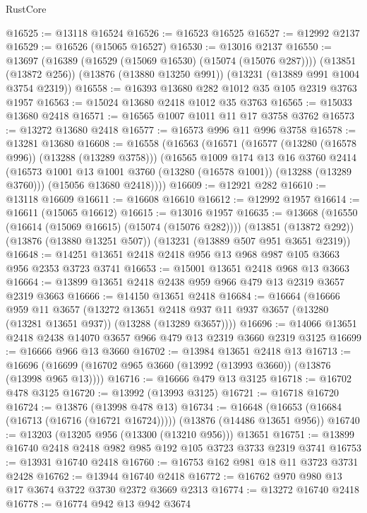\begin{lexlean}{RustCore}
\begin{coremodule}
@16525 := @13118 @16524
@16526 := @16523 @16525
@16527 := @12992 @2137
@16529 := @16526 (@15065 @16527)
@16530 := @13016 @2137
@16550 := @13697
    (@16389 (@16529 (@15069 @16530) (@15074 (@15076 @287))))
    (@13851 (@13872 @256))
    (@13876 (@13880 @13250 @991))
    (@13231 (@13889 @991 @1004 @3754 @2319))
@16558 := @16393 @13680 @282 @1012 @35 @105 @2319 @3763 @1957
@16563 := @15024 @13680 @2418 @1012 @35 @3763
@16565 := @15033 @13680 @2418
@16571 := @16565 @1007 @1011 @11 @17 @3758 @3762
@16573 := @13272 @13680 @2418
@16577 := @16573 @996 @11 @996 @3758
@16578 := @13281 @13680
@16608 := @16558
    (@16563
      (@16571
        (@16577 (@13280 (@16578 @996)) (@13288 (@13289 @3758)))
        (@16565
          @1009
          @174
          @13
          @16
          @3760
          @2414
          (@16573 @1001 @13 @1001 @3760 (@13280 (@16578 @1001)) (@13288 (@13289 @3760)))
          (@15056 @13680 @2418))))
@16609 := @12921 @282
@16610 := @13118 @16609
@16611 := @16608 @16610
@16612 := @12992 @1957
@16614 := @16611 (@15065 @16612)
@16615 := @13016 @1957
@16635 := @13668
    (@16550 (@16614 (@15069 @16615) (@15074 (@15076 @282))))
    (@13851 (@13872 @292))
    (@13876 (@13880 @13251 @507))
    (@13231 (@13889 @507 @951 @3651 @2319))
@16648 := @14251 @13651 @2418 @2418 @956 @13 @968 @987 @105 @3663 @956 @2353 @3723 @3741
@16653 := @15001 @13651 @2418 @968 @13 @3663
@16664 := @13899 @13651 @2418 @2438 @959 @966 @479 @13 @2319 @3657 @2319 @3663
@16666 := @14150 @13651 @2418
@16684 := @16664
    (@16666
      @959
      @11
      @3657
      (@13272
        @13651
        @2418
        @937
        @11
        @937
        @3657
        (@13280 (@13281 @13651 @937))
        (@13288 (@13289 @3657))))
@16696 := @14066 @13651 @2418 @2438 @14070 @3657 @966 @479 @13 @2319 @3660 @2319 @3125
@16699 := @16666 @966 @13 @3660
@16702 := @13984 @13651 @2418 @13
@16713 := @16696 (@16699 (@16702 @965 @3660 (@13992 (@13993 @3660)) (@13876 (@13998 @965 @13))))
@16716 := @16666 @479 @13 @3125
@16718 := @16702 @478 @3125
@16720 := @13992 (@13993 @3125)
@16721 := @16718 @16720
@16724 := @13876 (@13998 @478 @13)
@16734 := @16648 (@16653 (@16684 (@16713 (@16716 (@16721 @16724))))) (@13876 (@14486 @13651 @956))
@16740 := @13203 (@13205 @956 (@13300 (@13210 @956))) @13651
@16751 := @13899 @16740 @2418 @2418 @982 @985 @192 @105 @3723 @3733 @2319 @3741
@16753 := @13931 @16740 @2418
@16760 := @16753 @162 @981 @18 @11 @3723 @3731 @2428
@16762 := @13944 @16740 @2418
@16772 := @16762 @970 @980 @13 @17 @3674 @3722 @3730 @2372 @3669 @2313
@16774 := @13272 @16740 @2418
@16778 := @16774 @942 @13 @942 @3674

\end{coremodule}
\end{lexlean}
